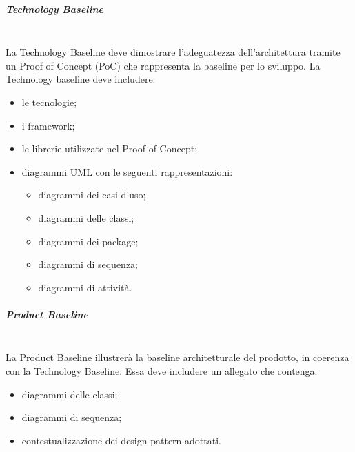 \subparagraph{Technology Baseline}\mbox{}\\
La Technology Baseline deve dimostrare l’adeguatezza dell’architettura tramite un Proof of Concept (PoC) che rappresenta la baseline per lo sviluppo. 
La Technology baseline deve includere:
\begin{itemize}
	\item le tecnologie;
	\item i framework;
	\item le librerie utilizzate nel Proof of Concept;
	\item diagrammi UML con le seguenti rappresentazioni:
	\begin{itemize}
		\item diagrammi dei casi d'uso; 
		\item diagrammi delle classi; 
		\item diagrammi dei package;
		\item diagrammi di sequenza; 
		\item diagrammi di attività.
	\end{itemize}
\end{itemize}

\subparagraph{Product Baseline}\mbox{}\\
La Product Baseline illustrerà la baseline architetturale del prodotto, in coerenza con la Technology Baseline.
Essa deve includere un allegato che contenga:
\begin{itemize}
	\item diagrammi delle classi;
	\item diagrammi di sequenza;
	\item contestualizzazione dei design pattern adottati.	
\end{itemize}

